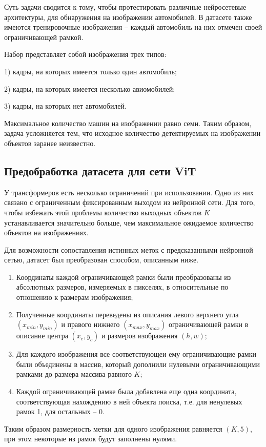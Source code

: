 \documentclass[14pt,a4paper]{extarticle}
\begin{document}
Суть задачи сводится к тому, чтобы протестировать различные нейросетевые архитектуры, для обнаружения на изображении автомобилей. В датасете также имеются тренировочные изображения -- каждый автомобиль на них отмечен своей ограничивающей рамкой. 

Набор представляет собой изображения трех типов:

1) кадры, на которых имеется только один автомобиль;

2) кадры, на которых имеется несколько авиомобилей;

3) кадры, на которых нет автомобилей.


Максимальное количество машин на изображении равно семи. Таким образом, задача усложняется тем, что исходное количество детектируемых на изображении объектов заранее неизвестно.
\newpage
\subsection{Предобработка датасета для сети ViT}

У трансформеров есть несколько ограничений при использовании. Одно из них связано с ограниченным фиксированным выходом из нейронной сети. Для того, чтобы избежать этой проблемы количество выходных объектов $K$ устанавливается значительно больше, чем максимальное ожидаемое количество объектов на изображениях. 

Для возможности сопоставления истинных меток с предсказанными нейронной сетью, датасет был преобразован способом, описанным ниже.
\begin{enumerate}
\item Координаты каждой ограничивающей рамки были преобразованы из абсолютных размеров, измеряемых в пикселях, в относительные по отношению к размерам изображения;
\item Полученные координаты переведены из описания левого верхнего угла $(x_{min}, y_{min})$ и правого нижнего $(x_{max}, y_{max})$ ограничивающей рамки в описание центра $(x_{c}, y_{c})$ и размеров изображения $(h, w)$;
\item Для каждого изображения все соответствующеи ему ограничивающие рамки были объединены в массив, который дополнили нулевыми ограничивающими рамками до размера массива равного $K$;
\item Каждой ограничивающей рамке была добавлена еще одна координата, соответствующая нахождению в ней объекта поиска, т.е. для ненулевых рамок 1, для остальных -- 0.
\end{enumerate}
Таким образом размерность метки для одного изображения равняется $(K, 5)$, при этом некоторые из рамок будут заполнены нулями.
\newpage
\end{document}
